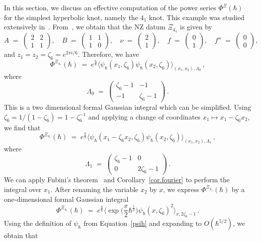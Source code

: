 \documentclass[12pt,reqno]{amsart}
\theoremstyle{definition}
\def\be{\begin{equation}}
\def\ee{\end{equation}}
\def\z{\zeta}
\def\hb{\hbar}
\renewcommand{\=}{\;=\;}
\begin{document}
In this section, we discuss an effective computation of the power series
$\Phi^{\Xi}(\hbar)$ for the simplest hyperbolic knot, namely the $4_1$ knot.
This example was studied extensively in~\cite{DG}. From~\cite[Ex. 2.6]{DG},
we obtain that the NZ datum $\Xi_{4_1}$ is given by
\be
A\=
\begin{pmatrix}
2 & 2\\
1 & 1
\end{pmatrix},\quad
B\=
\begin{pmatrix}
1 & 1\\
1 & 0
\end{pmatrix},\quad
\nu\=
\begin{pmatrix}
2\\
1
\end{pmatrix},\quad
f\=
\begin{pmatrix}
0\\
1
\end{pmatrix},\quad
f''\=
\begin{pmatrix}
0\\
0
\end{pmatrix},\quad
\ee
and $z_1=z_2=\z_6=e^{2\pi i/6}$. Therefore, we have
\be
\Phi^{\Xi_{4_1}}(\hbar) \= e^{\frac{\hbar}{8}}
\langle
\psi_{\hb}(x_1,\z_6)\psi_{\hb}(x_2,\z_6)\rangle_{(x_1,x_2),
\Lambda_0}\,,
\ee
where
\be
\Lambda_0
\=
\begin{pmatrix}
\z_6-1 & -1\\
-1 & \z_6-1
\end{pmatrix}\,.
\ee
This is a two dimensional formal Gaussian integral which can be simplified. 
Using $\z_6=1/(1-\z_6)=1-\z_6^{-1}$ and applying a change of coordinates
$x_1\mapsto x_1-\z_6x_2$, we find that
\be
\Phi^{\Xi_{4_1}}(\hbar) \= e^{\frac{\hbar}{8}}
\langle
\psi_{\hb}(x_1-\z_6x_2,\z_6)\psi_{\hb}(x_2,\z_6)\rangle_{(x_1,x_2),
\Lambda_1}\,,
\ee
where
\be
\Lambda_1
\=
\begin{pmatrix}
\z_6-1 & 0\\
0 & 2\z_6-1
\end{pmatrix}\,.
\ee
We can apply Fubini's theorem~\cite[Prop.2.13]{AarhusII} and
Corollary~\ref{cor.fourier} to perform the integral over $x_1$. After
renaming the variable $x_2$ by $x$, we express $\Phi^{\Xi_{4_1}}(\hbar)$ by a
one-dimensional formal Gaussian integral
\be
\label{eq.phi41.1d}
\Phi^{\Xi_{4_1}}(\hbar) \= e^{\frac{\hbar}{6}}
\Big\langle
\exp\Big(\frac{x}{2}\hbar^{\frac{1}{2}}\Big)\psi_{\hb}(x,\z_6)^2\Big\rangle_{x,
2\z_6-1}\,.
\ee
Using the definition of $\psi_\hbar$ from Equation~\eqref{psih} and expanding
to $O(\hbar^{5/2})$, we obtain that
\end{document}
